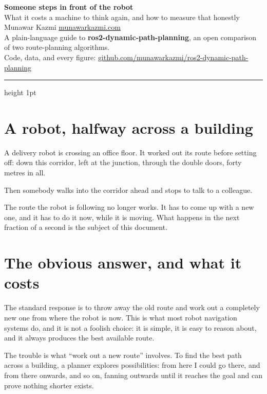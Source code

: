 \documentclass[11pt,a4paper]{article}
\begin{document}
\begin{center}
{\LARGE\bfseries\color{navy} Someone steps in front of the robot}\\[6pt]
{\large What it costs a machine to think again, and how to measure that honestly}\\[12pt]
{\small Munawar Kazmi \;\textbullet\; \href{https://munawarkazmi.com}{munawarkazmi.com}}\\[2pt]
{\small A plain-language guide to \textbf{ros2-dynamic-path-planning}, an open comparison of two route-planning algorithms.}\\[2pt]
{\small Code, data, and every figure: \href{https://github.com/munawarkazmi/ros2-dynamic-path-planning}{github.com/munawarkazmi/ros2-dynamic-path-planning}}
\end{center}

\vspace{4pt}
{\color{rule}\hrule height 1pt}
\vspace{10pt}

\section{A robot, halfway across a building}

A delivery robot is crossing an office floor. It worked out its route before setting off: down this corridor, left at the junction, through the double doors, forty metres in all.

Then somebody walks into the corridor ahead and stops to talk to a colleague.

The route the robot is following no longer works. It has to come up with a new one, and it has to do it now, while it is moving. What happens in the next fraction of a second is the subject of this document.

\section{The obvious answer, and what it costs}

The standard response is to throw away the old route and work out a completely new one from where the robot is now. This is what most robot navigation systems do, and it is not a foolish choice: it is simple, it is easy to reason about, and it always produces the best available route.

The trouble is what ``work out a new route'' involves. To find the best path across a building, a planner explores possibilities: from here I could go there, and from there onwards, and so on, fanning outwards until it reaches the goal and can prove nothing shorter exists.
\end{document}
